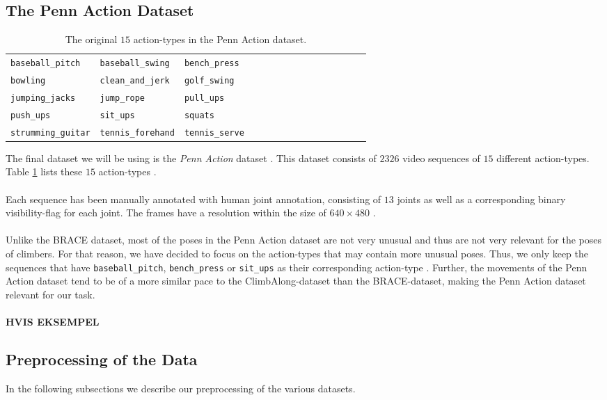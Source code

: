 \documentclass[./main.tex]{subfiles}
\begin{document}
\subsection{The Penn Action Dataset}
\begin{table}
    \begin{tabular}[htbp]{lllllllllllllll}
        \texttt{baseball\_pitch} & \texttt{baseball\_swing} & \texttt{bench\_press} \\
        \texttt{bowling} & \texttt{clean\_and\_jerk} & \texttt{golf\_swing} \\
        \texttt{jumping\_jacks} & \texttt{jump\_rope} & \texttt{pull\_ups} \\
        \texttt{push\_ups} & \texttt{sit\_ups} & \texttt{squats} \\
        \texttt{strumming\_guitar} & \texttt{tennis\_forehand} & \texttt{tennis\_serve}
    \end{tabular}
    \caption{The original $15$ action-types in the Penn Action dataset.}
    \label{tab:PA_actions}
\end{table}
The final dataset we will be using is the \textit{Penn Action} dataset \cite{penn_action}. This dataset consists of $2326$ video sequences of $15$ different action-types. Table \ref{tab:PA_actions} lists these $15$ action-types \cite{penn_action}.
\\
\\
Each sequence has been manually annotated with human joint annotation, consisting of $13$ joints as well as a corresponding binary visibility-flag for each joint. The frames have a resolution within the size of $640 \times 480$ \cite{penn_action}.
\\
\\
Unlike the BRACE dataset, most of the poses in the Penn Action dataset are not very unusual and thus are not very relevant for the poses of climbers. For that reason, we have decided to focus on the action-types that may contain more unusual poses. Thus, we only keep the sequences that have \texttt{baseball\_pitch}, \texttt{bench\_press} or \texttt{sit\_ups} as their corresponding action-type \cite{penn_action}. Further, the movements of the Penn Action dataset tend to be of a more similar pace to the ClimbAlong-dataset than the BRACE-dataset, making the Penn Action dataset relevant for our task.
\\
\\
\textbf{HVIS EKSEMPEL}

\subsection{Preprocessing of the Data}
In the following subsections we describe our preprocessing of the various datasets.
\end{document}
